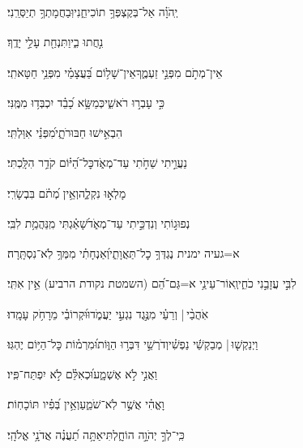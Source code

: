 \documentclass[12pt]{article}
\newcommand{\loc}[1]{\textsuperscript{\locf{#1}}}
\begin{document}
{\loc{ ב}~}‏יְֽהֹוָ֗ה אַל־בְּקֶצְפְּךָ֥ תוֹכִיחֵ֑נִי{\hfill}וּֽבַחֲמָתְךָ֥ תְיַסְּרֵֽנִי׃\par

{\loc{ ג}~}‏ נִ֣חֲתוּ בִ֑י{\hfill}וַתִּנְחַ֖ת עָלַ֣י יָדֶֽךָ׃\par

{\loc{ ד}~}‏אֵין־מְתֹ֣ם  מִפְּנֵ֣י זַעְמֶ֑ךָ{\hfill}אֵין־שָׁל֥וֹם בַּ֝עֲצָמַ֗י מִפְּנֵ֥י חַטָּאתִֽי׃\par

{\loc{ ה}~}‏כִּ֣י  עָבְר֣וּ רֹאשִׁ֑י{\hfill}כְּמַשָּׂ֥א כָ֝בֵ֗ד יִכְבְּד֥וּ מִמֶּֽנִּי׃\par

{\loc{ ו}~}‏הִבְאִ֣ישׁוּ  חַבּוּרֹתָ֑י{\hfill}מִ֝פְּנֵ֗י אִוַּלְתִּֽי׃\par

{\loc{ ז}~}‏נַעֲוֵ֣יתִי שַׁחֹ֣תִי עַד־מְאֹ֑ד{\hfill}כׇּל־הַ֝יּ֗וֹם קֹדֵ֥ר הִלָּֽכְתִּי׃\par

{\loc{ ח}~}‏ מָלְא֣וּ נִקְלֶ֑ה{\hfill}וְאֵ֥ין מְ֝תֹ֗ם בִּבְשָׂרִֽי׃\par

{\loc{ ט}~}‏נְפוּג֣וֹתִי וְנִדְכֵּ֣יתִי עַד־מְאֹ֑ד{\hfill}שָׁ֝אַ֗גְתִּי מִֽנַּהֲמַ֥ת לִבִּֽי׃\par

{\loc{ י}~}‏א=געיה ימנית נֶגְדְּךָ֥ כׇל־תַּאֲוָתִ֑י{\hfill}וְ֝אַנְחָתִ֗י מִמְּךָ֥ לֹֽא־נִסְתָּֽרָה׃\par

{\loc{ יא}~}‏לִבִּ֣י  עֲזָבַ֣נִי כֹחִ֑י{\hfill}וְֽאוֹר־עֵינַ֥י א=גַּם־הֵ֝ם (השמטת נקודת הרביע) אֵ֣ין אִתִּֽי׃\par

{\loc{ יב}~}‏אֹֽהֲבַ֨י |  וְרֵעַ֗י מִנֶּ֣גֶד נִגְעִ֣י יַעֲמֹ֑דוּ{\hfill}וּ֝קְרוֹבַ֗י מֵרָחֹ֥ק עָמָֽדוּ׃\par

{\loc{ יג}~}‏וַיְנַקְשׁ֤וּ |  מְבַקְשֵׁ֬י נַפְשִׁ֗י{\hfill}וְדֹרְשֵׁ֣י  דִּבְּר֣וּ הַוּ֑וֹת\newline\hspace*{.5em}וּ֝מִרְמ֗וֹת כׇּל־הַיּ֥וֹם יֶהְגּֽוּ׃\par

{\loc{ יד}~}‏וַאֲנִ֣י  לֹ֣א אֶשְׁמָ֑ע{\hfill}וּ֝כְאִלֵּ֗ם לֹ֣א יִפְתַּח־פִּֽיו׃\par

{\loc{ טו}~}‏וָאֱהִ֗י  אֲשֶׁ֣ר לֹֽא־שֹׁמֵ֑עַ{\hfill}וְאֵ֥ין בְּ֝פִ֗יו תּוֹכָחֽוֹת׃\par

{\loc{ טז}~}‏כִּֽי־לְךָ֣ יְהֹוָ֣ה הוֹחָ֑לְתִּי{\hfill}אַתָּ֥ה תַ֝עֲנֶ֗ה אֲדֹנָ֥י אֱלֹהָֽי׃\par
\end{document}
